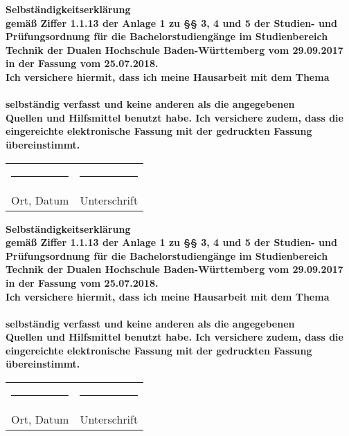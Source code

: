\thispagestyle{empty}
\begin{center}
	\vspace*{2cm}
	\Huge\bf Selbständigkeitserklärung\\
	\vspace*{3cm}
	\normalsize\rm
	gemäß Ziffer 1.1.13 der Anlage 1 zu §§ 3, 4 und 5  der Studien- und Prüfungsordnung für die Bachelorstudiengänge im Studienbereich Technik der Dualen Hochschule Baden-Württemberg vom 29.09.2017 in der Fassung vom 25.07.2018.\\
	Ich versichere hiermit, dass ich meine Hausarbeit mit dem Thema\\
	\vspace*{2cm}
	\Large\bf\myTopic\\
	\vspace*{2cm}
	\normalsize\rm
	selbständig verfasst und keine anderen als die angegebenen\\Quellen und Hilfsmittel benutzt habe. Ich versichere zudem, dass die eingereichte elektronische Fassung mit der gedruckten Fassung übereinstimmt.\\
	\vfill
	\begin{tabularx}{0.78\textwidth}{l@{\extracolsep\fill}l}
		\rule{4cm}{0.3mm}&\rule{4cm}{0.3mm}\\
	Ort, Datum&Unterschrift
	\end{tabularx}
\end{center}

\newpage
\thispagestyle{empty}
\begin{center}
	\vspace*{2cm}
	\Huge\bf Selbständigkeitserklärung\\
	\vspace*{3cm}
	\normalsize\rm
	gemäß Ziffer 1.1.13 der Anlage 1 zu §§ 3, 4 und 5  der Studien- und Prüfungsordnung für die Bachelorstudiengänge im Studienbereich Technik der Dualen Hochschule Baden-Württemberg vom 29.09.2017 in der Fassung vom 25.07.2018.\\
	Ich versichere hiermit, dass ich meine Hausarbeit mit dem Thema\\
	\vspace*{2cm}
	\Large\bf\myTopic\\
	\vspace*{2cm}
	\normalsize\rm
	selbständig verfasst und keine anderen als die angegebenen\\Quellen und Hilfsmittel benutzt habe. Ich versichere zudem, dass die eingereichte elektronische Fassung mit der gedruckten Fassung übereinstimmt.\\
	\vfill
	\begin{tabularx}{0.78\textwidth}{l@{\extracolsep\fill}l}
		\rule{4cm}{0.3mm}&\rule{4cm}{0.3mm}\\
	Ort, Datum&Unterschrift
	\end{tabularx}
\end{center}

